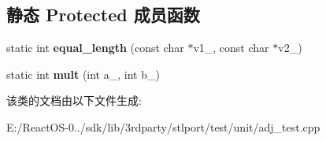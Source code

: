 \subsection*{静态 Protected 成员函数}
\begin{DoxyCompactItemize}
\item 
\mbox{\label{class_adj_test_a0727412c2a1005ebe91ab38c000e2a28}} 
static int {\bfseries equal\+\_\+length} (const char $\ast$v1\+\_\+, const char $\ast$v2\+\_\+)
\item 
\mbox{\label{class_adj_test_a0d8920ba03e2fddbbe16e13fa81f8a4f}} 
static int {\bfseries mult} (int a\+\_\+, int b\+\_\+)
\end{DoxyCompactItemize}


该类的文档由以下文件生成\+:\begin{DoxyCompactItemize}
\item 
E\+:/\+React\+O\+S-\/0../sdk/lib/3rdparty/stlport/test/unit/adj\+\_\+test.\+cpp\end{DoxyCompactItemize}
